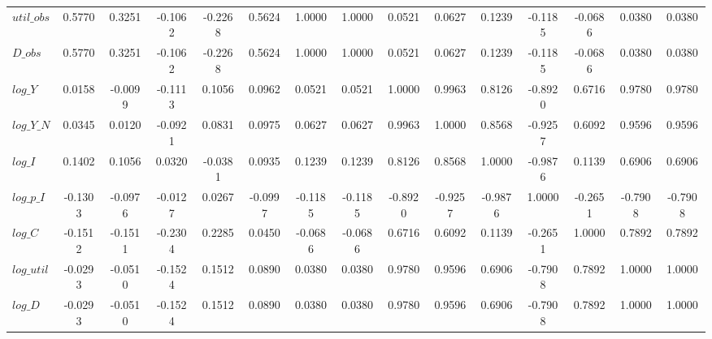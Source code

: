 \begin{center}
\begin{longtable}{lcccccccccccccc}
$util\_obs  $	 & 	       0.5770	 & 	       0.3251	 & 	      -0.1062	 & 	      -0.2268	 & 	       0.5624	 & 	       1.0000	 & 	       1.0000	 & 	       0.0521	 & 	       0.0627	 & 	       0.1239	 & 	      -0.1185	 & 	      -0.0686	 & 	       0.0380	 & 	       0.0380 \\ 
$D\_obs     $	 & 	       0.5770	 & 	       0.3251	 & 	      -0.1062	 & 	      -0.2268	 & 	       0.5624	 & 	       1.0000	 & 	       1.0000	 & 	       0.0521	 & 	       0.0627	 & 	       0.1239	 & 	      -0.1185	 & 	      -0.0686	 & 	       0.0380	 & 	       0.0380 \\ 
$log\_Y     $	 & 	       0.0158	 & 	      -0.0099	 & 	      -0.1113	 & 	       0.1056	 & 	       0.0962	 & 	       0.0521	 & 	       0.0521	 & 	       1.0000	 & 	       0.9963	 & 	       0.8126	 & 	      -0.8920	 & 	       0.6716	 & 	       0.9780	 & 	       0.9780 \\ 
$log\_Y\_N  $	 & 	       0.0345	 & 	       0.0120	 & 	      -0.0921	 & 	       0.0831	 & 	       0.0975	 & 	       0.0627	 & 	       0.0627	 & 	       0.9963	 & 	       1.0000	 & 	       0.8568	 & 	      -0.9257	 & 	       0.6092	 & 	       0.9596	 & 	       0.9596 \\ 
$log\_I     $	 & 	       0.1402	 & 	       0.1056	 & 	       0.0320	 & 	      -0.0381	 & 	       0.0935	 & 	       0.1239	 & 	       0.1239	 & 	       0.8126	 & 	       0.8568	 & 	       1.0000	 & 	      -0.9876	 & 	       0.1139	 & 	       0.6906	 & 	       0.6906 \\ 
$log\_p\_I  $	 & 	      -0.1303	 & 	      -0.0976	 & 	      -0.0127	 & 	       0.0267	 & 	      -0.0997	 & 	      -0.1185	 & 	      -0.1185	 & 	      -0.8920	 & 	      -0.9257	 & 	      -0.9876	 & 	       1.0000	 & 	      -0.2651	 & 	      -0.7908	 & 	      -0.7908 \\ 
$log\_C     $	 & 	      -0.1512	 & 	      -0.1511	 & 	      -0.2304	 & 	       0.2285	 & 	       0.0450	 & 	      -0.0686	 & 	      -0.0686	 & 	       0.6716	 & 	       0.6092	 & 	       0.1139	 & 	      -0.2651	 & 	       1.0000	 & 	       0.7892	 & 	       0.7892 \\ 
$log\_util  $	 & 	      -0.0293	 & 	      -0.0510	 & 	      -0.1524	 & 	       0.1512	 & 	       0.0890	 & 	       0.0380	 & 	       0.0380	 & 	       0.9780	 & 	       0.9596	 & 	       0.6906	 & 	      -0.7908	 & 	       0.7892	 & 	       1.0000	 & 	       1.0000 \\ 
$log\_D     $	 & 	      -0.0293	 & 	      -0.0510	 & 	      -0.1524	 & 	       0.1512	 & 	       0.0890	 & 	       0.0380	 & 	       0.0380	 & 	       0.9780	 & 	       0.9596	 & 	       0.6906	 & 	      -0.7908	 & 	       0.7892	 & 	       1.0000	 & 	       1.0000 \\ 
\end{longtable}
 \end{center}
